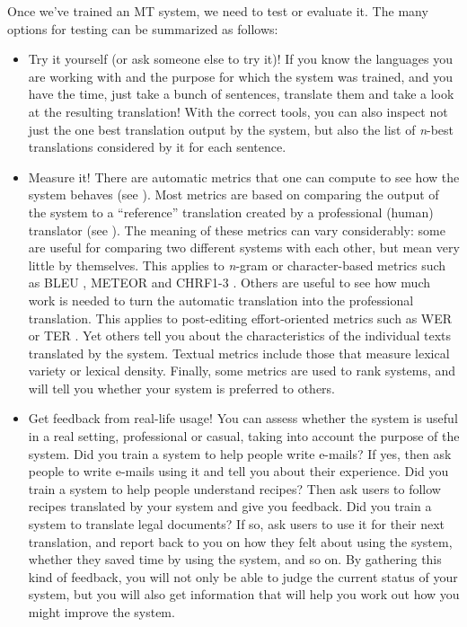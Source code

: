 \documentclass[output=paper]{langscibook}
\begin{document}
Once we've trained an MT system, we need to test or evaluate it. The many options for testing can be summarized as follows: 
\begin{itemize}
\item Try it yourself (or ask someone else to try it)! If you know the languages you are working with and the purpose for which the system was trained, and you have the time, just take a bunch of sentences, translate them and take a look at the resulting translation! With the correct tools, you can also inspect not just the one best translation output by the system, but also the list of \emph{n}-best translations considered by it for each sentence. 

\item Measure it! There are automatic metrics that one can compute to see how the system behaves (see ). Most metrics are based on comparing the output of the system to a “reference” translation created by a professional (human) translator (see ). The meaning of these metrics can vary considerably: some are useful for comparing two different systems with each other, but mean very little by themselves. This applies to \emph{n}-gram or character-based metrics such as BLEU \citep{papineni2002bleu}, METEOR \citep{denkowski:lavie:meteor-wmt:2014} and CHRF1-3 \citep{Pop2015}. Others are useful to see how much work is needed to turn the automatic translation into the professional translation. This applies to post-editing effort-oriented metrics such as WER \citep{Pop-Ney} or TER \citep{snover-etal-2006-study}. Yet others tell you about the characteristics of the individual texts translated by the system. Textual metrics include those that measure lexical variety or lexical density. Finally, some metrics are used to rank systems,  and will tell you whether your system is preferred to others.

\item Get feedback from real-life usage! You can assess whether the system is useful in a real setting, professional or casual, taking into account the purpose of the system. Did you train a system to help people write e-mails? If yes, then ask people to write e-mails using it and tell you about their experience. Did you train a system to help people understand recipes? Then ask users to follow recipes translated by your system and give you feedback. Did you train a system to translate legal documents? If so, ask users to use it for their next translation, and report back to you on how they felt about using the system, whether they saved time by using the system, and so on. By gathering this kind of feedback, you will not only be able to judge the current status of your system, but you will also get information that will help you work out how you might improve the system.

\end{itemize}
\end{document}
